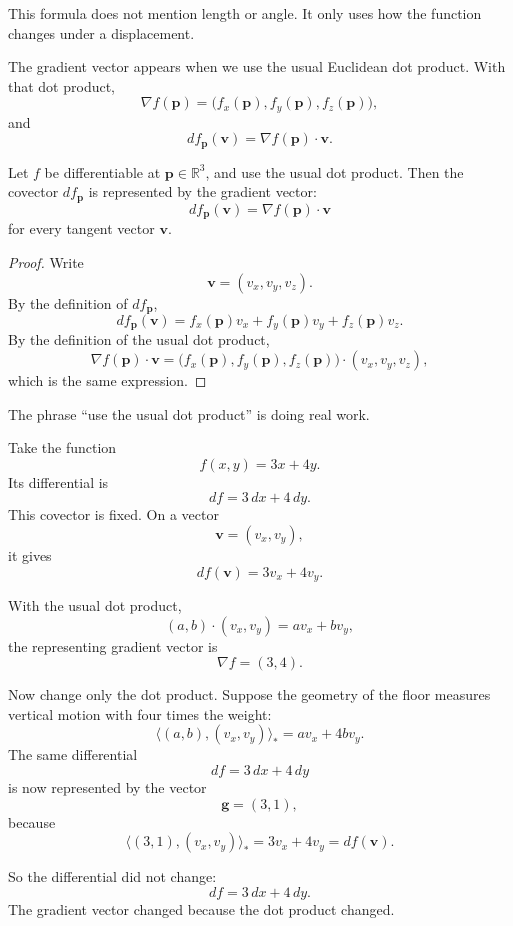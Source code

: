 This formula does not mention length or angle.  It only uses how the function changes
under a displacement.

The gradient vector appears when we use the usual Euclidean dot product.  With that
dot product,
\[
    \nabla f(\mathbf p)
    =
    \bigl(f_x(\mathbf p),f_y(\mathbf p),f_z(\mathbf p)\bigr),
\]
and
\[
\boxed{
    df_{\mathbf p}(\mathbf v)
    =
    \nabla f(\mathbf p)\cdot\mathbf v.
}
\]

\begin{theorem}
Let \(f\) be differentiable at \(\mathbf p\in\mathbb R^3\), and use the usual dot product.
Then the covector \(df_{\mathbf p}\) is represented by the gradient vector:
\[
\boxed{
    df_{\mathbf p}(\mathbf v)=\nabla f(\mathbf p)\cdot\mathbf v
}
\]
for every tangent vector \(\mathbf v\).
\end{theorem}

\begin{proof}
Write
\[
    \mathbf v=(v_x,v_y,v_z).
\]
By the definition of \(df_{\mathbf p}\),
\[
    df_{\mathbf p}(\mathbf v)
    =
    f_x(\mathbf p)v_x
    +
    f_y(\mathbf p)v_y
    +
    f_z(\mathbf p)v_z.
\]
By the definition of the usual dot product,
\[
    \nabla f(\mathbf p)\cdot\mathbf v
    =
    \bigl(f_x(\mathbf p),f_y(\mathbf p),f_z(\mathbf p)\bigr)
    \cdot
    (v_x,v_y,v_z),
\]
which is the same expression.
\end{proof}

The phrase ``use the usual dot product'' is doing real work.

\begin{example}
Take the function
\[
    f(x,y)=3x+4y.
\]
Its differential is
\[
\boxed{
    df=3\,dx+4\,dy.
}
\]
This covector is fixed.  On a vector
\[
    \mathbf v=(v_x,v_y),
\]
it gives
\[
    df(\mathbf v)=3v_x+4v_y.
\]

With the usual dot product,
\[
    (a,b)\cdot(v_x,v_y)=av_x+bv_y,
\]
the representing gradient vector is
\[
    \nabla f=(3,4).
\]

Now change only the dot product.  Suppose the geometry of the floor measures vertical
motion with four times the weight:
\[
    \langle (a,b),(v_x,v_y)\rangle_*
    =
    av_x+4bv_y.
\]
The same differential
\[
    df=3\,dx+4\,dy
\]
is now represented by the vector
\[
    \mathbf g=(3,1),
\]
because
\[
    \langle (3,1),(v_x,v_y)\rangle_*
    =
    3v_x+4v_y
    =
    df(\mathbf v).
\]

So the differential did not change:
\[
    df=3\,dx+4\,dy.
\]
The gradient vector changed because the dot product changed.
\end{example}

